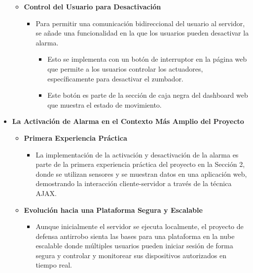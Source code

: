 \documentclass{report}
\begin{document}
\begin{itemize}
\begin{itemize}
        \item \textbf{Control del Usuario para Desactivación}
        \begin{itemize}
            \item Para permitir una comunicación bidireccional del usuario al servidor, se añade una funcionalidad en la que los usuarios pueden desactivar 
            la alarma.
            \begin{itemize}
                \item Esto se implementa con un botón de interruptor en la página web que permite a los usuarios controlar los actuadores, específicamente 
                para desactivar el zumbador.
                \item Este botón es parte de la sección de caja negra del dashboard web que muestra el estado de movimiento.
            \end{itemize}
        \end{itemize} 
    \end{itemize}

    \item \textbf{La Activación de Alarma en el Contexto Más Amplio del Proyecto}
    \begin{itemize}
        \item \textbf{Primera Experiencia Práctica}
        \begin{itemize}
            \item La implementación de la activación y desactivación de la alarma es parte de la primera experiencia práctica del proyecto en la Sección 2, 
            donde se utilizan sensores y se muestran datos en una aplicación web, demostrando la interacción cliente-servidor a través de la técnica AJAX.
        \end{itemize}

        \item \textbf{Evolución hacia una Plataforma Segura y Escalable}
        \begin{itemize}
            \item Aunque inicialmente el servidor se ejecuta localmente, el proyecto de defensa antirrobo sienta las bases para una plataforma en la nube 
            escalable donde múltiples usuarios pueden iniciar sesión de forma segura y controlar y monitorear sus dispositivos autorizados en tiempo real.
        \end{itemize}


\end{itemize}
\end{itemize}
\end{document}
